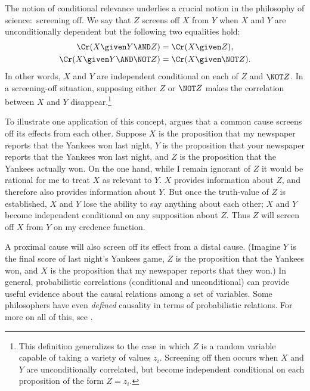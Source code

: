 The notion of conditional relevance underlies a crucial notion in the philosophy of science:\ screening off. We say that $Z$ screens off $X$ from $Y$ when $X$ and $Y$ are unconditionally dependent but the following two equalities hold:
\begin{align}
\Cr(X \given Y \AND Z)&=\Cr(X \given Z),\\
\Cr(X \given Y \AND \NOT Z)&=\Cr(X \given \NOT Z).
\end{align}
In other words, $X$ and $Y$ are independent conditional on each of $Z$ and $\NOT Z$. In a screening-off situation, supposing either $Z$ or $\NOT Z$ makes the correlation between $X$ and $Y$ disappear.\footnote
{This definition generalizes to the case in which $Z$ is a random variable capable of taking a variety of values $z_i$. Screening off then occurs when $X$ and $Y$ are unconditionally correlated, but become independent conditional on each proposition of the form $Z=z_i$.}

To illustrate one application of this concept, \citet{ReichenbachCommon} argues that a common cause screens off its effects from each other. Suppose $X$ is the proposition that my newspaper reports that the Yankees won last night, $Y$ is the proposition that your newspaper reports that the Yankees won last night, and $Z$ is the proposition that the Yankees actually won. On the one hand, while I remain ignorant of $Z$ it would be rational for me to treat $X$ as relevant to $Y$. $X$ provides information about $Z$, and therefore also provides information about $Y$. But once the truth-value of $Z$ is established, $X$ and $Y$ lose the ability to say anything about each other; $X$ and $Y$ become independent conditional on any supposition about $Z$. Thus $Z$ will screen off $X$ from $Y$ on my credence function.

A proximal cause will also screen off its effect from a distal cause. (Imagine $Y$ is the final score of last night's Yankees game, $Z$ is the proposition that the Yankees won, and $X$ is the proposition that my newspaper reports that they won.) In general, probabilistic correlations (conditional and unconditional) can provide useful evidence about the causal relations among a set of variables. Some philosophers have even \emph{defined} causality in terms of probabilistic relations. For more on all of this, see \citet{HitchcockSEP}.

